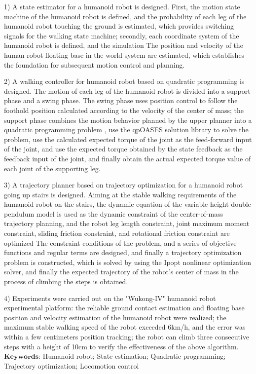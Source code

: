 1) A state estimator for a humanoid robot is designed. First, the motion state machine of the humanoid robot is defined, and the probability of each leg of the humanoid 
robot touching the ground is estimated, which provides switching signals for the walking state machine; secondly, each coordinate system of the humanoid robot is defined, 
and the simulation The position and velocity of the human-robot floating base in the world system are estimated, which establishes the foundation for subsequent motion control 
and planning.

2) A walking controller for humanoid robot based on quadratic programming is designed. The motion of each leg of the humanoid robot is divided into a support phase 
and a swing phase. The swing phase uses position control to follow the foothold position calculated according to the velocity of the center of mass; 
the support phase combines the motion behavior planned by the upper planner into a quadratic programming problem , use the qpOASES solution library to solve the problem, 
use the calculated expected torque of the joint as the feed-forward input of the joint, and use the expected torque obtained by the state feedback as the feedback input 
of the joint, and finally obtain the actual expected torque value of each joint of the supporting leg.

3) A trajectory planner based on trajectory optimization for a humanoid robot going up stairs is designed. Aiming at the stable walking requirements of the humanoid robot 
on the stairs, the dynamic equation of the variable-height double pendulum model is used as the dynamic constraint of the center-of-mass trajectory planning, and the robot 
leg length constraint, joint maximum moment constraint, sliding friction constraint, and rotational friction constraint are optimized The constraint conditions of the problem, 
and a series of objective functions and regular terms are designed, and finally a trajectory optimization problem is constructed, which is solved by using the Ipopt nonlinear 
optimization solver, and finally the expected trajectory of the robot's center of mass in the process of climbing the steps is obtained.

4) Experiments were carried out on the "Wukong-IV" humanoid robot experimental platform: the reliable ground contact estimation and floating base position and velocity 
estimation of the humanoid robot were realized; the maximum stable walking speed of the robot exceeded 6km/h, and the error was within a few centimeters position tracking; 
the robot can climb three consecutive steps with a height of 10cm to verify the effectiveness of the above algorithm.
$\textbf{Keywords}$: Humanoid robot; State estimation; Quadratic programming; Trajectory optimization; Locomotion control